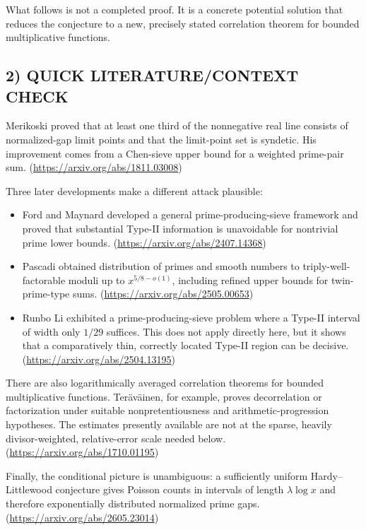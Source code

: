 What follows is not a completed proof. It is a concrete potential solution that reduces the conjecture to a new, precisely stated correlation theorem for bounded multiplicative functions.

\subsection*{2) QUICK LITERATURE/CONTEXT CHECK}

Merikoski proved that at least one third of the nonnegative real line consists of normalized-gap limit points and that the limit-point set is syndetic. His improvement comes from a Chen-sieve upper bound for a weighted prime-pair sum. (\url{https://arxiv.org/abs/1811.03008})

Three later developments make a different attack plausible:

\begin{itemize}
\item Ford and Maynard developed a general prime-producing-sieve framework and proved that substantial Type-II information is unavoidable for nontrivial prime lower bounds. (\url{https://arxiv.org/abs/2407.14368})
\item Pascadi obtained distribution of primes and smooth numbers to triply-well-factorable moduli up to \(x^{5/8-o(1)}\), including refined upper bounds for twin-prime-type sums. (\url{https://arxiv.org/abs/2505.00653})
\item Runbo Li exhibited a prime-producing-sieve problem where a Type-II interval of width only \(1/29\) suffices. This does not apply directly here, but it shows that a comparatively thin, correctly located Type-II region can be decisive. (\url{https://arxiv.org/abs/2504.13195})
\end{itemize}

There are also logarithmically averaged correlation theorems for bounded multiplicative functions. Teräväinen, for example, proves decorrelation or factorization under suitable nonpretentiousness and arithmetic-progression hypotheses. The estimates presently available are not at the sparse, heavily divisor-weighted, relative-error scale needed below. (\url{https://arxiv.org/abs/1710.01195})

Finally, the conditional picture is unambiguous: a sufficiently uniform Hardy–Littlewood conjecture gives Poisson counts in intervals of length \(\lambda\log x\) and therefore exponentially distributed normalized prime gaps. (\url{https://arxiv.org/abs/2605.23014})

